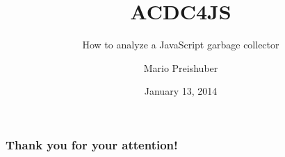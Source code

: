 \documentclass[xcolor=x11names,compress]{beamer}
\title{ACDC4JS}
\subtitle{How to analyze a JavaScript garbage collector}
\author{Mario Preishuber}
\institute[]{Department of Computer Sciences \ University of Salzburg}
\date{January 13, 2014}
\begin{document}
	\begin{frame}
		\titlepage
	\end{frame}


		
		
			
	
	\begin{frame}
		\frametitle{Thank you for your attention!}
	\end{frame}
\end{document}
